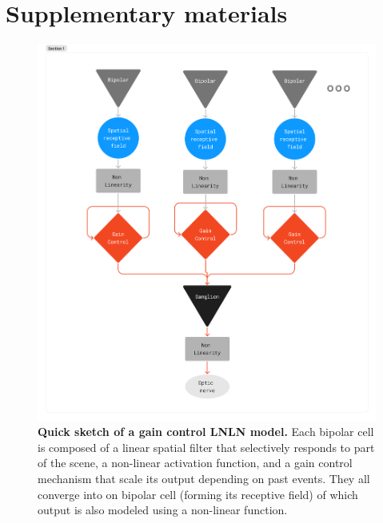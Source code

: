\section*{Supplementary materials}

\begin{figure}[ht]
    \centering
    \includegraphics[width=\textwidth]{pics/GCModelDiagram.png}
    \caption{\textbf{Quick sketch of a gain control LNLN model.} Each bipolar
        cell is
        composed of a linear spatial filter that selectively responds to part
        of the scene,
        a non-linear activation function, and a gain control mechanism that
        scale its output
        depending on past events. They all converge into on bipolar cell
        (forming its receptive field)
        of which output is also modeled using a non-linear function.}
    \label{fig:LNLN}
\end{figure}